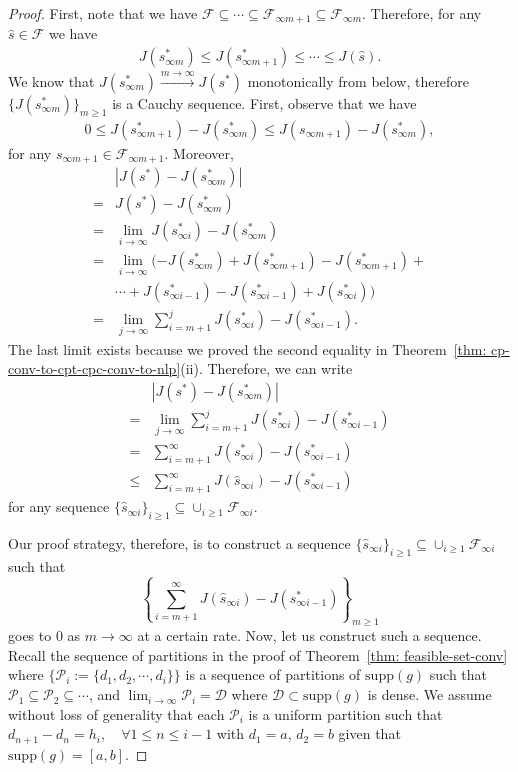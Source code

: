 \documentclass[12pt,leqno]{amsart}
\begin{document}
\begin{proof}
First, note that we have $\mathcal{F}\subseteq\cdots\subseteq\mathcal{F}_{\infty m+1}\subseteq\mathcal{F}_{\infty m}$. Therefore, for any $\hat{s}\in\mathcal{F}$ we have 
\begin{align*}
    J(s_{\infty m}^*)\leq J(s_{\infty m+1}^*)\leq\cdots\leq J(\hat{s}).
\end{align*}  
We know that $J(s_{\infty m}^*)\xrightarrow{m\rightarrow\infty}J(s^*)$ monotonically from below, therefore $\{J(s_{\infty m}^*)\}_{m\geq 1}$ is a Cauchy sequence. First, observe that we have
\begin{align*}
    0\leq J(s_{\infty m+1}^*) - J(s_{\infty m}^*)\leq J(s_{\infty m+1}) - J(s_{\infty m}^*),
\end{align*}
for any $s_{\infty m+1}\in\mathcal{F}_{\infty m+1}$. Moreover,
\begin{align*}
    &|J(s^*)-J(s_{\infty m}^*)|\\
    =&J(s^*)-J(s_{\infty m}^*)\\
    =&\lim_{i\rightarrow\infty}J(s_{\infty i}^*)-J(s_{\infty m}^*)\\
    =&\lim_{i\rightarrow\infty}(-J(s_{\infty m}^*)+J(s_{\infty m+1}^*)-J(s_{\infty m+1}^*)+\\
    &\cdots+J(s_{\infty i-1}^*)-J(s_{\infty i-1}^*)+J(s_{\infty i}^*))\\
    =&\lim_{j\rightarrow\infty}\sum_{i=m+1}^{j} J(s_{\infty i}^*)-J(s_{\infty i-1}^*).
\end{align*}
The last limit exists because we proved the second equality in Theorem~\ref{thm: cp-conv-to-cpt-cpc-conv-to-nlp}(ii). Therefore, we can write
\begin{align*}
    &|J(s^*)-J(s_{\infty m}^*)|\\
    =&\lim_{j\rightarrow\infty}\sum_{i=m+1}^{j} J(s_{\infty i}^*)-J(s_{\infty i-1}^*)\\
    =&\sum_{i=m+1}^{\infty} J(s_{\infty i}^*)-J(s_{\infty i-1}^*)\\
    \leq&\sum_{i=m+1}^{\infty} J(\hat{s}_{\infty i})-J(s_{\infty i-1}^*)
\end{align*}
for any sequence $\{\hat{s}_{\infty i}\}_{i\geq 1}\subseteq \cup_{i\geq 1}\mathcal{F}_{\infty i}$.

Our proof strategy, therefore, is to
construct a sequence $\{\hat{s}_{\infty i}\}_{i\geq 1}\subseteq \cup_{i\geq 1}\mathcal{F}_{\infty i}$ such that 
\[
\left\{\sum_{i=m+1}^{\infty}J(\hat{s}_{\infty i})-J(s_{\infty i-1}^*)\right\}_{m\geq 1}
\]
goes to $0$ as $m\rightarrow\infty$ at a certain rate.
Now, let us construct such a sequence. Recall the sequence of partitions in the proof of Theorem~\ref{thm: feasible-set-conv} where $\{\mathcal{P}_i:=\{d_1, d_2, \cdots,d_i\}\}$ is a sequence of partitions of $\mathrm{supp}(g)$ such that $\mathcal{P}_1\subseteq\mathcal{P}_2\subseteq\cdots$, and $\lim_{i\rightarrow\infty}\mathcal{P}_i=\mathcal{D}$ where $\mathcal{D}\subset \mathrm{supp}(g)$ is dense. We assume without loss of generality that each $\mathcal{P}_i$ is a uniform partition such that $d_{n+1}-d_n=h_i,\quad\forall 1\leq n\leq i-1$ with $d_1=a$, $d_2=b$ given that $\mathrm{supp}(g) = [a,b]$.



\end{proof}
\end{document}
